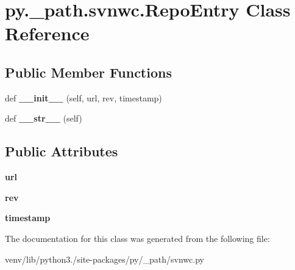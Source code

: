 \hypertarget{classpy_1_1__path_1_1svnwc_1_1_repo_entry}{}\section{py.\+\_\+path.\+svnwc.\+Repo\+Entry Class Reference}
\label{classpy_1_1__path_1_1svnwc_1_1_repo_entry}
\subsection*{Public Member Functions}
\begin{DoxyCompactItemize}
\item 
\mbox{\label{classpy_1_1__path_1_1svnwc_1_1_repo_entry_a40d90f994328bca833b193ed94346c69}} 
def {\bfseries \+\_\+\+\_\+init\+\_\+\+\_\+} (self, url, rev, timestamp)
\item 
\mbox{\label{classpy_1_1__path_1_1svnwc_1_1_repo_entry_ab239df854ce7aab729922e8cd8fc5f6f}} 
def {\bfseries \+\_\+\+\_\+str\+\_\+\+\_\+} (self)
\end{DoxyCompactItemize}
\subsection*{Public Attributes}
\begin{DoxyCompactItemize}
\item 
\mbox{\label{classpy_1_1__path_1_1svnwc_1_1_repo_entry_a8997bbc69139425df12fb28157ef12d7}} 
{\bfseries url}
\item 
\mbox{\label{classpy_1_1__path_1_1svnwc_1_1_repo_entry_ab7ddc95a23e71de4b11ae29e06a2d915}} 
{\bfseries rev}
\item 
\mbox{\label{classpy_1_1__path_1_1svnwc_1_1_repo_entry_a056d977bdcd75241c71aa4772cdca4eb}} 
{\bfseries timestamp}
\end{DoxyCompactItemize}


The documentation for this class was generated from the following file\+:\begin{DoxyCompactItemize}
\item 
venv/lib/python3./site-\/packages/py/\+\_\+path/svnwc.\+py\end{DoxyCompactItemize}
